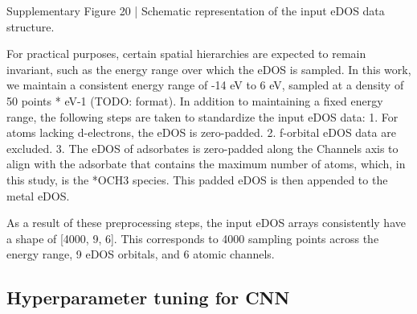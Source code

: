 Supplementary Figure 20 | Schematic representation of the input eDOS data structure.


For practical purposes, certain spatial hierarchies are expected to remain invariant,
such as the energy range over which the eDOS is sampled.
In this work, we maintain a consistent energy range of -14 eV to 6 eV,
sampled at a density of 50 points * eV-1 (TODO: format).
In addition to maintaining a fixed energy range,
the following steps are taken to standardize the input eDOS data:
  1.	For atoms lacking d-electrons, the eDOS is zero-padded.
  2.	f-orbital eDOS data are excluded.
  3.	The eDOS of adsorbates is zero-padded along the Channels axis to align with the adsorbate that contains the maximum number of atoms, which, in this study, is the *OCH3 species. This padded eDOS is then appended to the metal eDOS.

As a result of these preprocessing steps, the input eDOS arrays consistently have a shape of [4000, 9, 6].
This corresponds to 4000 sampling points across the energy range, 9 eDOS orbitals, and 6 atomic channels.


\subsection{Hyperparameter tuning for CNN}

